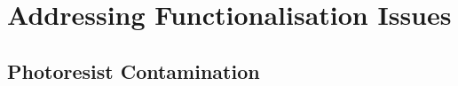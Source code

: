 \documentclass[
  a4paper,
]{scrbook}
\begin{document}
\hypertarget{sec-impediments}{%
\section{Addressing Functionalisation Issues}\label{sec-impediments}}

\hypertarget{sec-photoresist-contamination}{%
\subsection{Photoresist
Contamination}\label{sec-photoresist-contamination}}

\begin{figure}

\begin{minipage}[t]{0.47\linewidth}

{\centering 


}

\subcaption{\label{fig-SU8-only}}
\end{minipage}%
%
\begin{minipage}[t]{0.05\linewidth}

{\centering 

~

}

\end{minipage}%
%
\begin{minipage}[t]{0.47\linewidth}


\end{minipage}
\end{figure}
\end{document}
